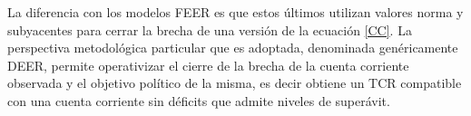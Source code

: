 \documentclass[12pt,letterpaper]{article}
\begin{document}

La diferencia con los modelos FEER es que estos últimos utilizan valores norma y subyacentes para cerrar la brecha de una versión de la ecuación \ref{CC}. La perspectiva metodológica particular que es adoptada, denominada genéricamente DEER, permite operativizar el cierre de la brecha de la cuenta corriente observada y el objetivo político de la misma, es decir obtiene un TCR compatible con una cuenta corriente sin déficits que admite niveles de superávit.
\end{document}

